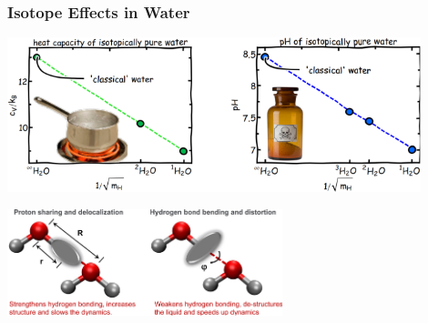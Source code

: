 \begin{frame}
  \frametitle{Isotope Effects in Water}
  \begin{center}
    \includegraphics[width=0.9\textwidth]{figs/water_isotope_effects.pdf}
  \end{center}
  \smallskip
  \begin{center}
    \includegraphics[width=0.6\textwidth]{figs/competing_quantum_effect_water_dimer.pdf}
  \end{center}
\end{frame}
